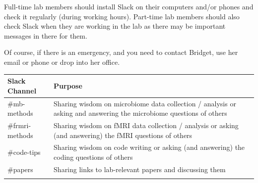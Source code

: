 \documentclass[]{book}
\begin{document}
Full-time lab members should install Slack on their computers and/or phones and check it regularly (during working hours). Part-time lab members should also check Slack when they are working in the lab as there may be important messages in there for them.

Of course, if there is an emergency, and you need to contact Bridget, use her email or phone or drop into her office.

\begin{longtable}[]{@{}ll@{}}
\toprule
\begin{minipage}[b]{0.10\columnwidth}\raggedright
Slack Channel\strut
\end{minipage} & \begin{minipage}[b]{0.84\columnwidth}\raggedright
Purpose\strut
\end{minipage}\tabularnewline
\midrule
\endhead
\begin{minipage}[t]{0.10\columnwidth}\raggedright
\#mb-methods\strut
\end{minipage} & \begin{minipage}[t]{0.84\columnwidth}\raggedright
Sharing wisdom on microbiome data collection / analysis or asking and answering the microbiome questions of others\strut
\end{minipage}\tabularnewline
\begin{minipage}[t]{0.10\columnwidth}\raggedright
\#frmri-methods\strut
\end{minipage} & \begin{minipage}[t]{0.84\columnwidth}\raggedright
Sharing wisdom on fMRI data collection / analysis or asking (and answering) the fMRI questions of others\strut
\end{minipage}\tabularnewline
\begin{minipage}[t]{0.10\columnwidth}\raggedright
\#code-tips\strut
\end{minipage} & \begin{minipage}[t]{0.84\columnwidth}\raggedright
Sharing wisdom on code writing or asking (and answering) the coding questions of others\strut
\end{minipage}\tabularnewline
\begin{minipage}[t]{0.10\columnwidth}\raggedright
\#papers\strut
\end{minipage} & \begin{minipage}[t]{0.84\columnwidth}\raggedright
Sharing links to lab-relevant papers and discussing them\strut
\end{minipage}\tabularnewline
\begin{minipage}[t]{0.10\columnwidth}\raggedright

\end{minipage}
\end{longtable}
\end{document}
